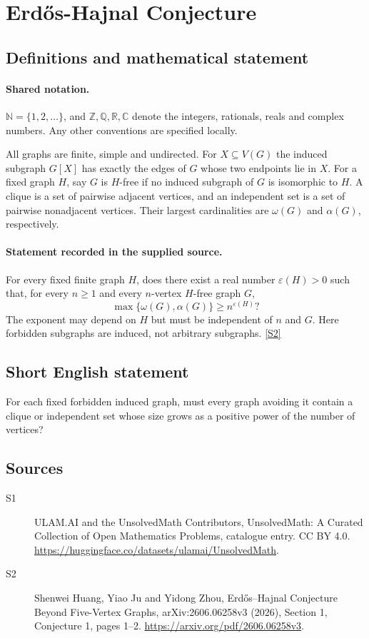 \documentclass[11pt]{article}
\newcommand{\sref}[2]{\hyperlink{source:#1:#2}{[S#2]}}
\begin{document}
\section{Erdős-Hajnal Conjecture}\label{statement}

\subsection{Definitions and mathematical statement}

\paragraph{Shared notation.}$\mathbb N=\{1,2,\ldots\}$, and $\mathbb Z,\mathbb Q,\mathbb R,\mathbb C$ denote the integers, rationals, reals and complex numbers. Any other conventions are specified locally.


All graphs are finite, simple and undirected. For $X\subseteq V(G)$ the induced subgraph $G[X]$ has exactly the edges of $G$ whose two endpoints lie in $X$. For a fixed graph $H$, say $G$ is $H$-free if no induced subgraph of $G$ is isomorphic to $H$. A clique is a set of pairwise adjacent vertices, and an independent set is a set of pairwise nonadjacent vertices. Their largest cardinalities are $\omega(G)$ and $\alpha(G)$, respectively.
\paragraph{Statement recorded in the supplied source.}
For every fixed finite graph $H$, does there exist a real number $\varepsilon(H)>0$ such that, for every $n\ge1$ and every $n$-vertex $H$-free graph $G$,
\[
 \max\{\omega(G),\alpha(G)\}\ge n^{\varepsilon(H)}?
\]
The exponent may depend on $H$ but must be independent of $n$ and $G$. Here forbidden subgraphs are induced, not arbitrary subgraphs. \sref{statement}{2}
\subsection{Short English statement}
For each fixed forbidden induced graph, must every graph avoiding it contain a clique or independent set whose size grows as a positive power of the number of vertices?
\subsection{Sources}
\begin{description}
\item[\hypertarget{source:statement:1}{S1}] ULAM.AI and the UnsolvedMath Contributors, UnsolvedMath: A Curated Collection of Open Mathematics Problems, catalogue entry. CC BY 4.0. \url{https://huggingface.co/datasets/ulamai/UnsolvedMath}.
\item[\hypertarget{source:statement:2}{S2}] Shenwei Huang, Yiao Ju and Yidong Zhou, Erdős–Hajnal Conjecture Beyond Five-Vertex Graphs, arXiv:2606.06258v3 (2026), Section 1, Conjecture 1, pages 1--2. \url{https://arxiv.org/pdf/2606.06258v3}.
\end{description}
\label{end:statement}
\end{document}
